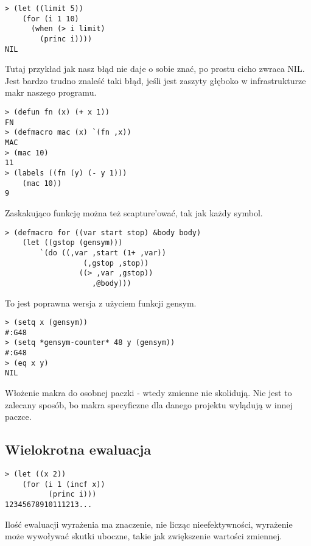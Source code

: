 \begin{frame}[fragile]{}
\begin{verbatim}
> (let ((limit 5))
    (for (i 1 10)
      (when (> i limit)
        (princ i))))
NIL
\end{verbatim}
\pause
Tutaj przykład jak nasz błąd nie daje o sobie znać, po prostu cicho zwraca NIL.
Jest bardzo trudno znaleść taki błąd, jeśli jest zaszyty głęboko w infrastrukturze makr naszego programu.
\end{frame}

\begin{frame}[fragile]{}
\begin{verbatim}
> (defun fn (x) (+ x 1))
FN
> (defmacro mac (x) `(fn ,x))
MAC
> (mac 10)
11
> (labels ((fn (y) (- y 1)))
    (mac 10))
9
\end{verbatim}
\pause
Zaskakująco funkcję można też scapture'ować, tak jak każdy symbol.
\end{frame}

\begin{frame}[fragile]{}
\begin{verbatim}
> (defmacro for ((var start stop) &body body)
    (let ((gstop (gensym)))
        `(do ((,var ,start (1+ ,var))
                  (,gstop ,stop))
                 ((> ,var ,gstop))
	                ,@body)))
\end{verbatim}
\pause
To jest poprawna wersja z użyciem funkcji gensym.
\pause
\begin{verbatim}
> (setq x (gensym))
#:G48
> (setq *gensym-counter* 48 y (gensym))
#:G48
> (eq x y)
NIL
\end{verbatim}
\end{frame}

\begin{frame}
Włożenie makra do osobnej paczki - wtedy zmienne nie skolidują. Nie jest to zalecany sposób, bo makra specyficzne dla danego projektu wylądują w innej paczce.
\end{frame}

\subsection{Wielokrotna ewaluacja} %
\label{sub:Wielokrotna ewaluacja}
\begin{frame}[fragile]{}
\begin{verbatim}
> (let ((x 2))
    (for (i 1 (incf x))
          (princ i)))
12345678910111213...
\end{verbatim}
\pause
Ilość ewaluacji wyrażenia ma znaczenie, nie licząc nieefektywności, wyrażenie może wywoływać skutki uboczne, takie jak zwiększenie wartości zmiennej.
\end{frame}

